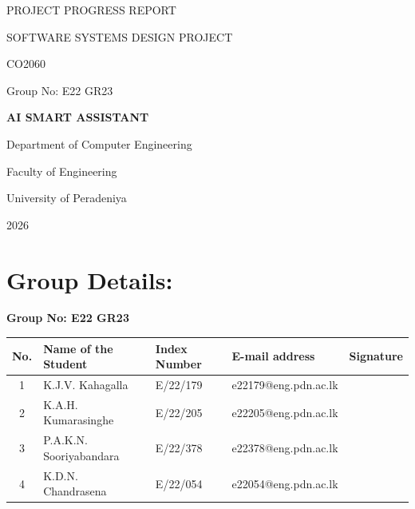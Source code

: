 \documentclass[12pt,a4paper]{report}
\begin{document}
\begin{titlepage}
    \centering
    \vspace*{2cm}
    
    {\Large PROJECT PROGRESS REPORT\par}
    \vspace{0.5cm}
    {\Large SOFTWARE SYSTEMS DESIGN PROJECT\par}
    \vspace{0.5cm}
    {\Large CO2060\par}
    
    \vspace{4cm}
    
    {\Large Group No: E22 GR23\par}
    \vspace{0.5cm}
    {\Large \textbf{AI SMART ASSISTANT}\par}
    
    \vfill
    
    {\Large Department of Computer Engineering\par}
    \vspace{0.5cm}
    {\Large Faculty of Engineering\par}
    \vspace{0.5cm}
    {\Large University of Peradeniya\par}
    \vspace{0.5cm}
    {\Large 2026\par}
\end{titlepage}

\newpage
\section*{Group Details:}
\textbf{Group No: E22 GR23} \\

\noindent
\begin{tabularx}{\textwidth}{|c|X|l|X|c|}
\hline
No. & Name of the Student & Index Number & E-mail address & Signature \\
\hline
1 & K.J.V. Kahagalla & E/22/179 & e22179@eng.pdn.ac.lk & \hspace{1.5cm} \\
\hline
2 & K.A.H. Kumarasinghe & E/22/205 & e22205@eng.pdn.ac.lk & \\
\hline
3 & P.A.K.N. Sooriyabandara & E/22/378 & e22378@eng.pdn.ac.lk & \\
\hline
4 & K.D.N. Chandrasena & E/22/054 & e22054@eng.pdn.ac.lk & \\
\hline
\end{tabularx}
\end{document}
